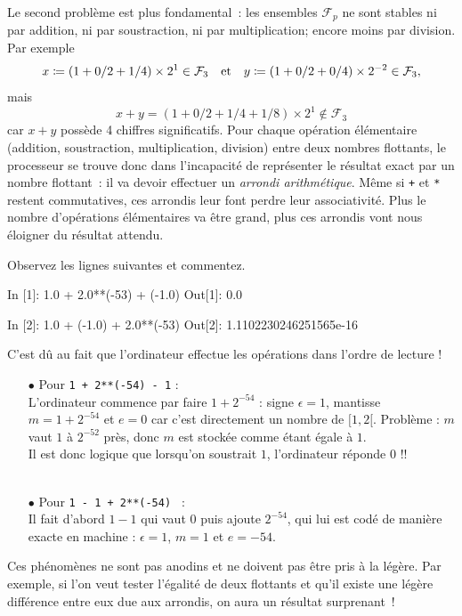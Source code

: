 \documentclass{magnoliaold}
\begin{document}
Le second problème est plus fondamental~: les ensembles $\mathcal{F}_p$ ne sont
stables ni par addition, ni par soustraction, ni par multiplication; encore moins par
division. Par exemple
\[x\coloneqq (1+0/2+1/4)\times 2^1 \in\mathcal{F}_3 \quad\text{et}\quad
  y\coloneqq (1+0/2+0/4)\times 2^{-2}\in\mathcal{F}_3,\]
mais
\[x+y=(1+0/2+1/4+1/8)\times 2^1\not\in\mathcal{F}_3\]
car $x+y$ possède 4 chiffres significatifs. Pour chaque opération élémentaire (addition,
soustraction, multiplication, division) entre deux nombres flottants, le processeur se
trouve donc dans l'incapacité de
représenter le résultat exact par un nombre flottant~: il va devoir effectuer
un \emph{arrondi arithmétique}.
 Même si \verb_+_ et \verb_*_ restent commutatives,
ces arrondis leur font perdre leur associativité.
Plus le nombre d'opérations élémentaires
va être grand, plus ces arrondis vont nous éloigner du résultat attendu.
\vspace{2ex}
\begin{exoUnique}
\exo Observez les lignes suivantes et commentez.
\begin{pythoncode}
In [1]: 1.0 + 2.0**(-53) + (-1.0)
Out[1]: 0.0

In [2]: 1.0 + (-1.0) + 2.0**(-53)
Out[2]: 1.1102230246251565e-16
\end{pythoncode}
\begin{sol}
C'est dû au fait que l'ordinateur effectue les opérations dans l'ordre de lecture !
\begin{itemize}
\item[$\bullet$] Pour \texttt{1 + 2**(-54) - 1} :\\ L'ordinateur  commence par faire $1 + 2^{-54}$ :
signe $\epsilon = 1$, mantisse $m=1+2^{-54}$ et 
$e=0$ car c'est directement un nombre de $[1,2[$.
Problème :  $m$ vaut $1$ à $2^{-52}$ près, donc $m$ est stockée comme étant égale à $1$. \\Il est donc logique que lorsqu'on soustrait $1$, l'ordinateur réponde $0$ !!\\
\\

\item[$\bullet$] Pour \texttt{1 - 1 + 2**(-54) } :\\
Il fait d'abord $1-1$ qui vaut $0$ puis ajoute $2^{-54}$, qui lui est codé de manière exacte en machine : $\epsilon = 1$,  $m=1$ et $e = -54$. 
\end{itemize}
\end{sol} 
\end{exoUnique}
\vspace{2ex}
Ces phénomènes ne sont pas anodins et ne doivent pas être pris à la légère. Par exemple, si l'on veut tester l'égalité de deux flottants et qu'il existe une légère différence entre
eux due aux arrondis, on aura un résultat surprenant~!
\end{document}
